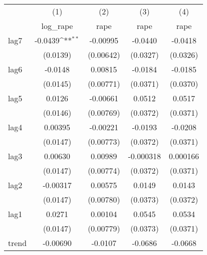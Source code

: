 {
\def\sym#1{\ifmmode^{#1}\else\(^{#1}\)\fi}
\begin{tabular}{l*{4}{c}}
\hline\hline
            &\multicolumn{1}{c}{(1)}&\multicolumn{1}{c}{(2)}&\multicolumn{1}{c}{(3)}&\multicolumn{1}{c}{(4)}\\
            &\multicolumn{1}{c}{log\_rape}&\multicolumn{1}{c}{rape}&\multicolumn{1}{c}{rape}&\multicolumn{1}{c}{rape}\\
\hline
lag7        &     -0.0439\sym{**} &    -0.00995         &     -0.0440         &     -0.0418         \\
            &    (0.0139)         &   (0.00642)         &    (0.0327)         &    (0.0326)         \\
[1em]
lag6        &     -0.0148         &     0.00815         &     -0.0184         &     -0.0185         \\
            &    (0.0145)         &   (0.00771)         &    (0.0371)         &    (0.0370)         \\
[1em]
lag5        &      0.0126         &    -0.00661         &      0.0512         &      0.0517         \\
            &    (0.0146)         &   (0.00769)         &    (0.0372)         &    (0.0371)         \\
[1em]
lag4        &     0.00395         &    -0.00221         &     -0.0193         &     -0.0208         \\
            &    (0.0147)         &   (0.00773)         &    (0.0372)         &    (0.0371)         \\
[1em]
lag3        &     0.00630         &     0.00989         &   -0.000318         &    0.000166         \\
            &    (0.0147)         &   (0.00774)         &    (0.0372)         &    (0.0371)         \\
[1em]
lag2        &    -0.00317         &     0.00575         &      0.0149         &      0.0143         \\
            &    (0.0147)         &   (0.00780)         &    (0.0373)         &    (0.0372)         \\
[1em]
lag1        &      0.0271         &     0.00104         &      0.0545         &      0.0534         \\
            &    (0.0147)         &   (0.00779)         &    (0.0373)         &    (0.0371)         \\
[1em]
trend       &    -0.00690         &     -0.0107         &     -0.0686         &     -0.0668         \\

\end{tabular}}
